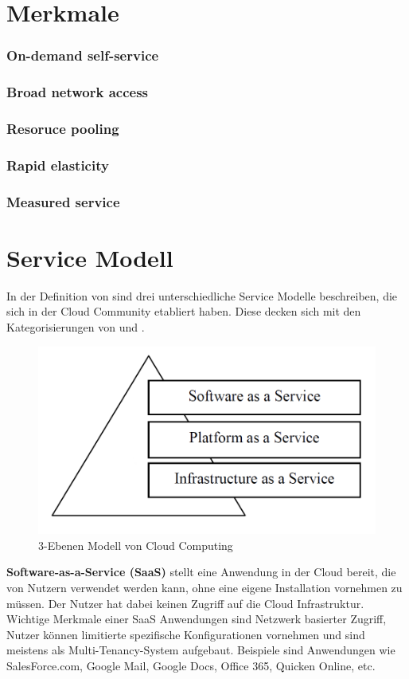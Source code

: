 \section{Merkmale}
\subsubsection{On-demand self-service}\label{selfservice}
\subsubsection{Broad network access}\label{networkaccess}
\subsubsection{Resoruce pooling}\label{resourcepooling}
\subsubsection{Rapid elasticity}\label{rapidelasticity}
\subsubsection{Measured service}\label{measuredservice}
\cite*[vgl.][S.2]{Mell.2011}

\section{Service Modell}\label{serviceModell}
In der Definition von \cite*[S.2]{Mell.2011} sind drei unterschiedliche Service Modelle beschreiben, die sich in der Cloud Community etabliert haben. Diese decken sich mit den Kategorisierungen von \cite[S. 28]{Tharam.2010} und \cite[S. 878]{Jadeja.2012}.

	\begin{figure}[h]
		\centering
		\includegraphics[width=0.5\linewidth]{images/cloud_computing_pyramide}
		\caption{3-Ebenen Modell von Cloud Computing}
		\label{fig:CloudComputingPyramide}
	\end{figure}


\textbf{Software-as-a-Service (SaaS)} stellt eine Anwendung in der Cloud bereit, die von Nutzern verwendet werden kann, ohne eine eigene Installation vornehmen zu müssen. Der Nutzer hat dabei keinen Zugriff auf die Cloud Infrastruktur. Wichtige Merkmale einer SaaS Anwendungen sind Netzwerk basierter Zugriff, Nutzer können limitierte spezifische Konfigurationen vornehmen und sind meistens als Multi-Tenancy-System aufgebaut. Beispiele sind Anwendungen wie SalesForce.com, Google Mail, Google Docs, Office 365, Quicken Online, etc.
\\

